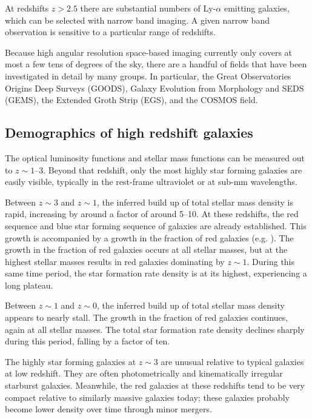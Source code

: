 At redshifts $z>2.5$ there are substantial numbers of Ly-$\alpha$
emitting galaxies, which can be selected with narrow band imaging. A
given narrow band observation is sensitive to a particular range of
redshifts. 

Because high angular resolution space-based imaging currently only
covers at most a few tens of degrees of the sky, there are a handful
of fields that have been investigated in detail by many groups. In
particular, the Great Observatories Origins Deep Surveys (GOODS),
Galaxy Evolution from Morphology and SEDS (GEMS), the Extended Groth
Strip (EGS), and the COSMOS field.

\subsection{Demographics of high redshift galaxies}

The optical luminosity functions and stellar mass functions can be
measured out to $z\sim 1$--3. Beyond that redshift, only the most
highly star forming galaxies are easily visible, typically in the
rest-frame ultraviolet or at sub-mm wavelengths.

Between $z\sim 3$ and $z\sim 1$, the inferred build up of total
stellar mass density is rapid, increasing by around a factor of around
5--10. At these redshifts, the red sequence and blue star forming
sequence of galaxies are already established. This growth is
accompanied by a growth in the fraction of red galaxies
(e.g. \citealt{mortlock15a}). The growth in the fraction of red
galaxies occurs at all stellar masses, but at the highest stellar
masses results in red galaxies dominating by $z\sim 1$. During this
same time period, the star formation rate density is at its highest,
experiencing a long plateau.

Between $z\sim 1$ and $z\sim 0$, the inferred build up of total
stellar mass density appears to nearly stall. The growth in the
fraction of red galaxies continues, again at all stellar masses. The
total star formation rate density declines sharply during this period,
falling by a factor of ten.

The highly star forming galaxies at $z\sim 3$ are unusual relative to
typical galaxies at low redshift. They are often photometrically and
kinematically irregular starburst galaxies. Meanwhile, the red
galaxies at these redshifts tend to be very compact relative to
similarly massive galaxies today; these galaxies probably become lower
density over time through minor mergers.

